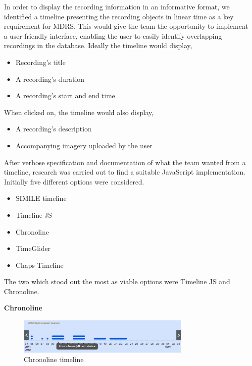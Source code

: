 \documentclass{l3proj}
\begin{document}

In order to display the recording information in an informative format, we identified a timeline presenting the recording objects in linear time as a key requirement for MDRS. This would give the team the opportunity to implement a user-friendly interface, enabling the user to easily identify overlapping recordings in the database. Ideally the timeline would display,

\begin{itemize}
\item{Recording's title}
\item{A recording's duration}
\item{A recording's start and end time}
\end{itemize}

When clicked on, the timeline would also display,
\begin{itemize}
\item{A recording's description}
\item{Accompanying imagery uploaded by the user}
\end{itemize}

After verbose specification and documentation of what the team wanted from a timeline, research was carried out to find a suitable \gls{JavaScript} implementation. Initially five different options were considered.
\begin{itemize}
\item{SIMILE timeline\cite{SIMILE}}
\item{Timeline JS\cite{TimelineJS}}
\item{Chronoline\cite{Chronoline}}
\item{TimeGlider\cite{TimegliderGithub}}
\item{Chaps Timeline\cite{Chaps}}
\end{itemize}
The two which stood out the most as viable options were Timeline JS and Chronoline.

\textbf{Chronoline}
\begin{figure}[ht!]
  \centering
\includegraphics[width=0.75\textwidth]{images/Chronoline.png}
\caption{Chronoline timeline}
\end{figure}
\end{document}
